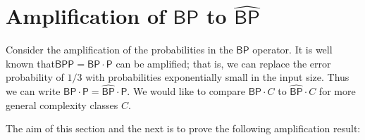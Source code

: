 \documentclass[11pt]{article}
\newcommand{\bp}{\textsf{BP}}
\newcommand{\strongbp}{\widehat{\textsf{BP}}}
\newcommand{\bpp}{\textsf{BPP}}
\newcommand{\p}{\textsf{P}}
\begin{document}
\section{Amplification of $\bp$ to $\strongbp$\label{amplifysection}}

Consider the amplification of the probabilities in the $\bp$ operator. It is well known that\linebreak $\bpp = \bp \cdot \p$ can be amplified; that is, we can replace the error probability of $1/3$ with probabilities exponentially small in the input size. Thus we can write $\bp \cdot \p = \strongbp \cdot \p$. We would like to compare $\bp \cdot C$ to $\strongbp \cdot C$ for more general complexity classes $C$.

The aim of this section and the next is to prove the following amplification result:
\end{document}
